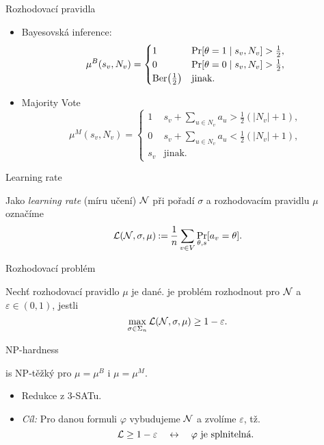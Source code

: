 \documentclass [14pt,xcolor=dvipsnames,aspectratio=169]{beamer}
\def\problemClass{\textsf}
\def\np{\problemClass{NP}}
\begin{document}
\begin{frame}{Rozhodovací pravidla}
    \begin{itemize}
        \item<1-> Bayesovská inference: \[
    \mu^B(s_v, N_v) = \begin{cases}
        1 & \text{$\pr{\theta = 1 \suchthat s_v, N_v} > \frac 12$}, \\
        0 & \text{$\pr{\theta = 0 \suchthat s_v, N_v} > \frac 12$}, \\
        \berd{\frac 12} & \text{jinak.}
    \end{cases}
        \]
        \item<2-> Majority Vote \[
    \mu^M(s_v, N_v) = \begin{cases}
        1 & \text{$s_v + \sum_{u \in N_v} a_u > \frac 12 (|N_v| + 1)$}, \\
        0 & \text{$s_v + \sum_{u \in N_v} a_u < \frac 12 (|N_v| + 1)$}, \\
				s_v & \text{jinak.}
    \end{cases}
        \]
    \end{itemize}
\end{frame}

\begin{frame}{Learning rate}
\begin{defi}
    Jako \emph{learning rate} (míru učení) $ \network $ při pořadí $ \sigma $ a rozhodovacím pravidlu $\mu$ označíme \[
		\clr \network \sigma \mu \deq  \frac 1n\sum_{v \in V} \Pr_{\theta, s}[a_v = \theta].
	\]
\end{defi}
\end{frame}

\begin{frame}{Rozhodovací problém}
\begin{defi}[{\netlearn{}}]
        Nechť rozhodovací pravidlo $\mu$ je dané.
        \netlearn{} je problém rozhodnout pro $ \network $ a $ \varepsilon \in (0,1)$, jestli \[
            \max_{\sigma \in \Sigma_n} \lr \network \sigma \mu \geq 1-\varepsilon.
        \]
\end{defi}
\end{frame}

\begin{frame}{\np{}-hardness}
    \begin{thm}
        \netlearn{} is \np{}-těžký pro $ \mu = \mu^B $ i $ \mu = \mu^M $.
    \end{thm}
    \begin{itemize}
        \item<2-> Redukce z 3-SATu.
        \item<3-> \emph{Cíl:} Pro danou formuli $\varphi$ vybudujeme $\network$ a zvolíme $\varepsilon$, tž. \[
           \mathcal{L} \geq 1-\varepsilon \quad\iff\quad \text{$ \varphi $ je splnitelná.}
        \] 
    \end{itemize}
\end{frame}
\end{document}
